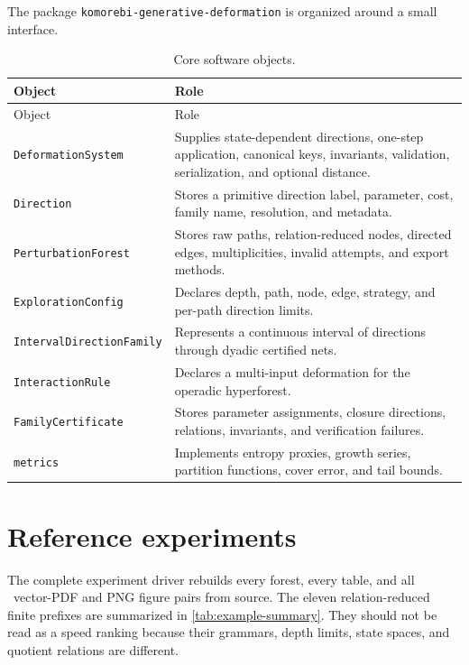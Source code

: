 \documentclass[11pt,openany]{report}
\theoremstyle{definition}
\theoremstyle{remark}
\begin{document}
The package \texttt{komorebi-generative-deformation} is organized around a small interface.

\begin{longtable}{L{0.28\textwidth}L{0.62\textwidth}}
\caption{Core software objects.}\label{tab:api}\\
\toprule
Object & Role \\
\midrule
\endfirsthead
\toprule
Object & Role \\
\midrule
\endhead
\texttt{DeformationSystem} & Supplies state-dependent directions, one-step application, canonical keys, invariants, validation, serialization, and optional distance.\\
\texttt{Direction} & Stores a primitive direction label, parameter, cost, family name, resolution, and metadata.\\
\texttt{PerturbationForest} & Stores raw paths, relation-reduced nodes, directed edges, multiplicities, invalid attempts, and export methods.\\
\texttt{ExplorationConfig} & Declares depth, path, node, edge, strategy, and per-path direction limits.\\
\texttt{IntervalDirectionFamily} & Represents a continuous interval of directions through dyadic certified nets.\\
\texttt{InteractionRule} & Declares a multi-input deformation for the operadic hyperforest.\\
\texttt{FamilyCertificate} & Stores parameter assignments, closure directions, relations, invariants, and verification failures.\\
\texttt{metrics} & Implements entropy proxies, growth series, partition functions, cover error, and tail bounds.\\
\bottomrule
\end{longtable}

\section{Reference experiments}

The complete experiment driver rebuilds every forest, every table, and all \FigureCount\ vector-PDF and PNG figure pairs from source. The eleven relation-reduced finite prefixes are summarized in \cref{tab:example-summary}. They should not be read as a speed ranking because their grammars, depth limits, state spaces, and quotient relations are different.
\end{document}
